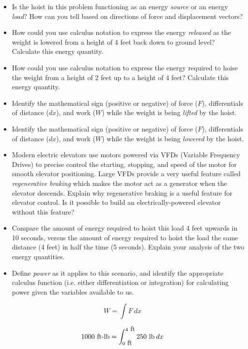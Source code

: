 \begin{itemize}
\item{} Is the hoist in this problem functioning as an energy {\it source} or an energy {\it load}?  How can you tell based on directions of force and displacement vectors? 
\item{} How could you use calculus notation to express the energy {\it released} as the weight is lowered from a height of 4 feet back down to ground level?  Calculate this energy quantity.
\item{} How could you use calculus notation to express the energy required to hoise the weight from a height of 2 feet up to a height of 4 feet?  Calculate this energy quantity.
\item{} Identify the mathematical sign (positive or negative) of force ($F$), differentials of distance ($dx$), and work ($W$) while the weight is being {\it lifted} by the hoist.
\item{} Identify the mathematical sign (positive or negative) of force ($F$), differentials of distance ($dx$), and work ($W$) while the weight is being {\it lowered} by the hoist.
\item{} Modern electric elevators use motors powered via VFDs (Variable Frequency Drives) to precise control the starting, stopping, and speed of the motor for smooth elevator positioning.  Large VFDs provide a very useful feature called {\it regenerative braking} which makes the motor act as a generator when the elevator descends.  Explain why regenerative braking is a useful feature for elevator control.  Is it possible to build an electrically-powered elevator without this feature?
\item{} Compare the amount of energy required to hoist this load 4 feet upwards in 10 seconds, versus the amount of energy required to hoist the load the same distance (4 feet) in half the time (5 seconds).  Explain your analysis of the two energy quantities.
\item{} Define {\it power} as it applies to this scenario, and identify the appropriate calculus function (i.e. either differentiation or integration) for calculating power given the variables available to us.
\end{itemize}







$$W = \int F \> dx$$

$$1000 \hbox{ ft-lb} = \int_{0\hbox{ ft}}^{4\hbox{ ft}} 250 \hbox{ lb} \> dx$$












